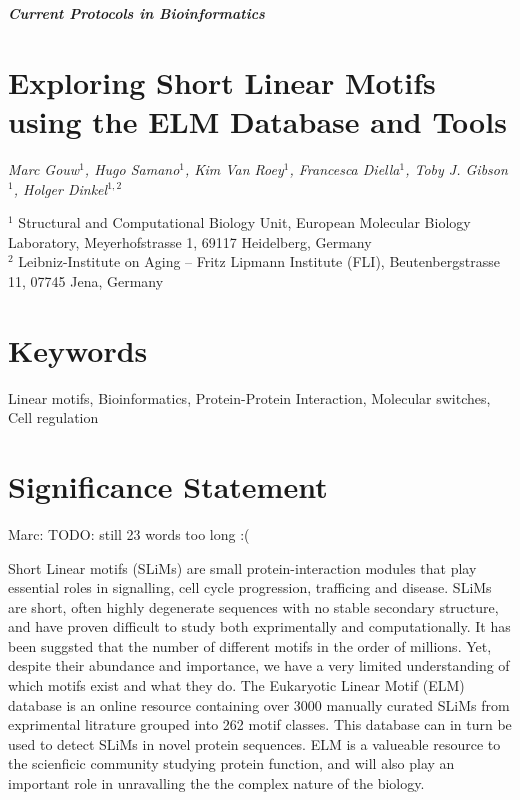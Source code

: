 \documentclass[12pt]{article}
\begin{document}

\thispagestyle{plain}
\begin{center}

\textbf{\LARGE \textit{Current Protocols in Bioinformatics}}\\\vspace{2mm}
\end{center}

\section*{Exploring Short Linear Motifs using the ELM Database and Tools}

{\small \it
Marc Gouw$^{1}$,
Hugo Samano$^{1}$,
Kim Van Roey$^{1}$,
Francesca Diella$^{1}$,
Toby J. Gibson$^{1}$,
Holger Dinkel$^{1,2}$

$^{1}$ Structural and Computational Biology Unit, European Molecular Biology
Laboratory, Meyerhofstrasse 1, 69117 Heidelberg, Germany\\
$^{2}$ Leibniz-Institute on Aging -- Fritz Lipmann Institute (FLI),
Beutenbergstrasse 11, 07745 Jena, Germany
}

\section*{Keywords}

Linear motifs, Bioinformatics, Protein-Protein Interaction, Molecular
switches, Cell regulation

\section*{Significance Statement}

Marc: TODO: still 23 words too long :(

Short Linear motifs (SLiMs) are small protein-interaction modules that play
essential roles in signalling, cell cycle progression, trafficing and disease.
SLiMs are short, often highly degenerate sequences with no stable
secondary structure, and have proven difficult to study both exprimentally
and computationally.
It has been suggsted that the number of different motifs in the
order of millions.
Yet, despite their abundance and importance, we have a very limited
understanding of which motifs exist and what they do.
The Eukaryotic Linear Motif (ELM) database is an online resource containing
over 3000 manually curated SLiMs from exprimental
litrature grouped into 262 motif classes.
This database can in turn be used to detect SLiMs in novel protein sequences.
ELM is a valueable resource to the scienficic community studying protein
function, and will also play an important role in unravalling the 
the complex nature of the biology.
\end{document}
